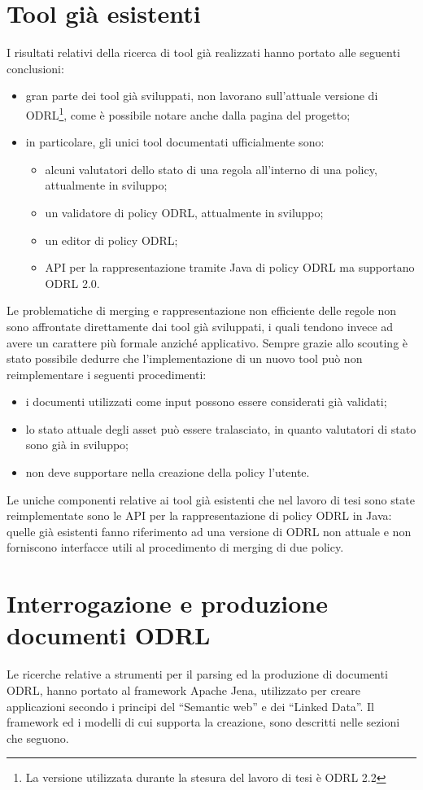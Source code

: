 \documentclass[12pt,a4paper,twoside]{book}
\begin{document}
\section{Tool già esistenti}
I risultati relativi della ricerca di tool già realizzati hanno portato alle seguenti conclusioni:
\begin{itemize}
	\item gran parte dei tool già sviluppati, non lavorano sull'attuale versione di ODRL\footnote{La versione utilizzata durante la stesura del lavoro di tesi è ODRL 2.2 }, come è possibile notare anche dalla pagina del progetto\cite{ODRLPage};
	\item in particolare, gli unici tool documentati ufficialmente sono:
	\begin{itemize}
		\item alcuni valutatori dello stato di una regola all'interno di una policy\cite{evalStatus}, attualmente in sviluppo;
		\item un validatore di policy ODRL\cite{validator}, attualmente in sviluppo;
		\item un editor di policy ODRL\cite{editor};
		\item API per la rappresentazione tramite Java di policy ODRL\cite{api} ma supportano ODRL 2.0.
	\end{itemize}
\end{itemize}
Le problematiche di merging e rappresentazione non efficiente delle regole non sono affrontate direttamente dai tool già sviluppati, i quali tendono invece ad avere un carattere più formale anziché applicativo. Sempre grazie allo scouting è stato possibile dedurre che l'implementazione di un nuovo tool può non reimplementare i seguenti procedimenti:
\begin{itemize}
	\item i documenti utilizzati come input possono essere considerati già validati;
	\item lo stato attuale degli asset può essere tralasciato, in quanto valutatori di stato sono già in sviluppo;
	\item non deve supportare nella creazione della policy l'utente.
\end{itemize}
Le uniche componenti relative ai tool già esistenti che nel lavoro di tesi sono state reimplementate sono le API per la rappresentazione di policy ODRL in Java: quelle già esistenti fanno riferimento ad una versione di ODRL non attuale e non forniscono interfacce utili al procedimento di merging di due policy. 
\section{Interrogazione e produzione documenti ODRL}
Le ricerche relative a strumenti per il parsing ed la produzione di documenti ODRL, hanno portato al framework Apache Jena\cite{Jena}, utilizzato per creare applicazioni secondo i principi del ``Semantic web''\cite{SemanticWeb} e dei ``Linked Data''. Il framework ed i modelli di cui supporta la creazione, sono descritti nelle sezioni che seguono.
\end{document}
